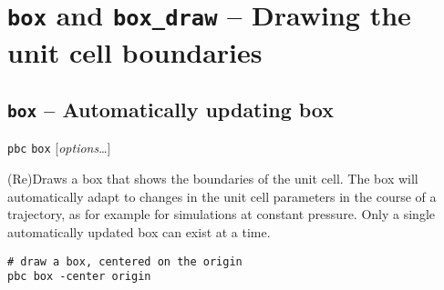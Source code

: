 \documentclass[a4paper, DIV12]{scrartcl}
\begin{document}
\newpage
\section{\texttt{box} and \texttt{box\_draw} -- Drawing the unit cell boundaries}

\subsection{\texttt{box} -- Automatically updating box}
\label{sec:box}


\texttt{pbc} \texttt{box} [\textit{options}\dots]


(Re)Draws a box that shows the boundaries of the unit cell. The box
will automatically adapt to changes in the unit cell parameters in the
course of a trajectory, as for example for simulations at constant
pressure. Only a single automatically updated box can exist at a time.


\begin{Verbatim}
# draw a box, centered on the origin
pbc box -center origin
\end{Verbatim}

\end{document}
